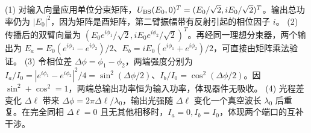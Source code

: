(1) 对输入向量应用单位分束矩阵，\(U_{\rm BS}(E_0,0)^T=(E_0/\sqrt2,iE_0/\sqrt2)^T\)。输出总功率仍为 \(|E_0|^2\)，因为矩阵是酉矩阵，第二臂振幅带有反射引起的相位因子 \(i\)。
(2) 传播后的双臂向量为 \((E_0e^{i\phi_1}/\sqrt2,iE_0e^{i\phi_2}/\sqrt2)^T\)。再经同一理想分束器，两个输出为 \(E_a=E_0(e^{i\phi_1}-e^{i\phi_2})/2\)、\(E_b=iE_0(e^{i\phi_1}+e^{i\phi_2})/2\)，可直接由矩阵乘法验证。
(3) 令相位差 \(\Delta\phi=\phi_1-\phi_2\)，两端强度分别为 \(I_a/I_0=|e^{i\phi_1}-e^{i\phi_2}|^2/4=\sin^2(\Delta\phi/2)\)、\(I_b/I_0=\cos^2(\Delta\phi/2)\)。因 \(\sin^2+\cos^2=1\)，两端总输出功率恒为输入功率，体现器件无吸收。
(4) 光程差变化 \(\Delta\ell\) 带来 \(\Delta\phi=2\pi\Delta\ell/\lambda_0\)，输出光强随 \(\Delta\ell\) 变化一个真空波长 \(\lambda_0\) 后重复。在完全同相 \(\Delta\ell=0\) 且无其他相移时，\(I_a=0,I_b=I_0\)，体现两个端口的互补干涉。
